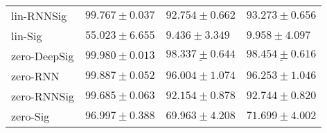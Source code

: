 \begin{tabular}{llll}
lin-RNNSig     &                           $ 99.767 \pm 0.037 $ &                           $ 92.754 \pm 0.662 $ &                           $ 93.273 \pm 0.656 $ \\
lin-Sig        &                           $ 55.023 \pm 6.655 $ &                            $ 9.436 \pm 3.349 $ &                            $ 9.958 \pm 4.097 $ \\
\midrule
zero-DeepSig   &               $  \mathbf{ 99.980 \pm 0.013 } $ &            $  \underline{ 98.337 \pm 0.644 } $ &            $  \underline{ 98.454 \pm 0.616 } $ \\
zero-RNN       &                           $ 99.887 \pm 0.052 $ &                           $ 96.004 \pm 1.074 $ &                           $ 96.253 \pm 1.046 $ \\
zero-RNNSig    &                           $ 99.685 \pm 0.063 $ &                           $ 92.154 \pm 0.878 $ &                           $ 92.744 \pm 0.820 $ \\
zero-Sig       &                           $ 96.997 \pm 0.388 $ &                           $ 69.963 \pm 4.208 $ &                           $ 71.699 \pm 4.002 $ \\
\bottomrule
\end{tabular}
